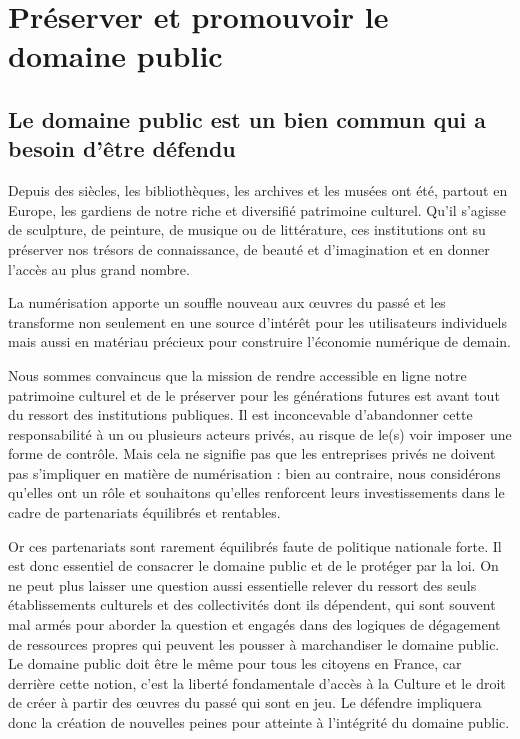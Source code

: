 \chapter{Préserver et promouvoir le domaine public}\label{dompub}

\section{Le domaine public est un bien commun qui a besoin d'être défendu}
Depuis des siècles, les bibliothèques, les archives et les musées ont été, partout en Europe, les
gardiens de notre riche et diversifié patrimoine culturel. Qu’il s’agisse de sculpture, de peinture,
de musique ou de littérature, ces institutions ont su préserver nos trésors de connaissance, de
beauté et d’imagination et en donner l’accès au plus grand nombre.

La numérisation apporte un souffle nouveau aux œuvres du passé et les transforme non
seulement en une source d’intérêt pour les utilisateurs individuels mais aussi en matériau précieux
pour construire l’économie numérique de demain.

Nous sommes convaincus que la mission de rendre accessible en ligne notre patrimoine culturel
et de le préserver pour les générations futures est avant tout du ressort des
institutions publiques. Il est inconcevable d’abandonner cette responsabilité à un ou plusieurs
acteurs privés, au risque de le(s) voir imposer une forme de contrôle. Mais cela ne signifie pas que
les entreprises privés ne doivent pas s’impliquer en matière de numérisation : bien au contraire,
nous considérons qu’elles ont un rôle et souhaitons qu’elles renforcent leurs investissements dans
le cadre de partenariats équilibrés et rentables.

Or ces partenariats sont rarement équilibrés faute de politique nationale forte. Il est donc essentiel de consacrer le domaine public et de le protéger par la loi. On ne peut plus laisser une question aussi essentielle relever du ressort des seuls établissements culturels et des collectivités dont ils dépendent, qui sont souvent mal armés pour aborder la question et engagés dans des logiques de dégagement de ressources propres qui peuvent les pousser à marchandiser le domaine public. Le domaine public doit être le même pour tous les citoyens en France, car derrière cette notion, c’est la liberté fondamentale d’accès à la Culture et le droit de créer à partir des œuvres du passé qui sont en jeu. Le défendre impliquera donc la création de nouvelles peines pour atteinte à l'intégrité du domaine public.

